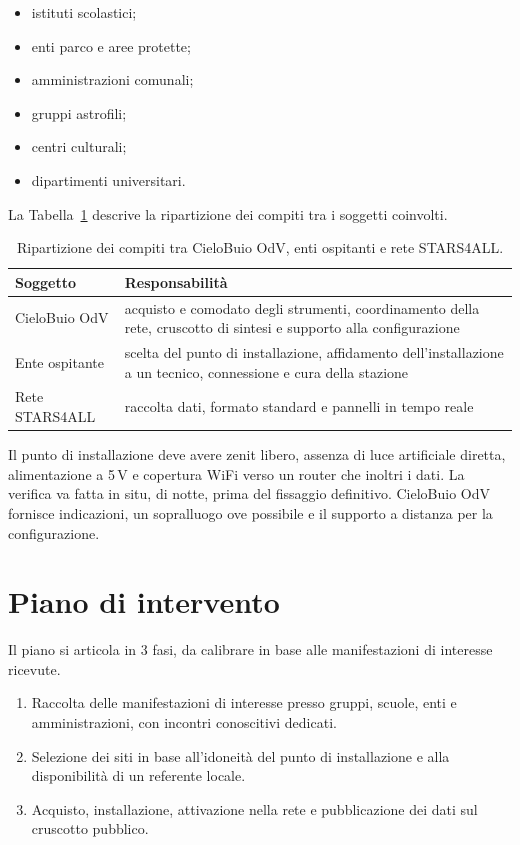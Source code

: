 \documentclass[11pt,a4paper]{report}
\begin{document}
\begin{itemize}
\item istituti scolastici;
\item enti parco e aree protette;
\item amministrazioni comunali;
\item gruppi astrofili;
\item centri culturali;
\item dipartimenti universitari.
\end{itemize}

La Tabella~\ref{tab:ruoli} descrive la ripartizione dei compiti tra i soggetti coinvolti.

\begin{table}[ht!]

\centering
\renewcommand{\arraystretch}{1.5}

\begin{tabularx}{\linewidth}{@{}l X@{}}
\toprule
Soggetto & Responsabilità \\
\midrule
CieloBuio OdV & acquisto e comodato degli strumenti, coordinamento della rete, cruscotto di sintesi e supporto alla configurazione \\
Ente ospitante & scelta del punto di installazione, affidamento dell'installazione a un tecnico, connessione e cura della stazione \\
Rete STARS4ALL & raccolta dati, formato standard e pannelli in tempo reale \\
\bottomrule
\end{tabularx}

\caption{Ripartizione dei compiti tra CieloBuio OdV, enti ospitanti e rete STARS4ALL.}
\label{tab:ruoli}
\end{table}

Il punto di installazione deve avere zenit libero, assenza di luce artificiale diretta, alimentazione a 5\,V e copertura WiFi verso un router che inoltri i dati. La verifica va fatta in situ, di notte, prima del fissaggio definitivo. CieloBuio OdV fornisce indicazioni, un sopralluogo ove possibile e il supporto a distanza per la configurazione.

\section*{Piano di intervento}

Il piano si articola in 3 fasi, da calibrare in base alle manifestazioni di interesse ricevute.

\begin{enumerate}
\item Raccolta delle manifestazioni di interesse presso gruppi, scuole, enti e amministrazioni, con incontri conoscitivi dedicati.
\item Selezione dei siti in base all'idoneità del punto di installazione e alla disponibilità di un referente locale.
\item Acquisto, installazione, attivazione nella rete e pubblicazione dei dati sul cruscotto pubblico.
\end{enumerate}
\end{document}
